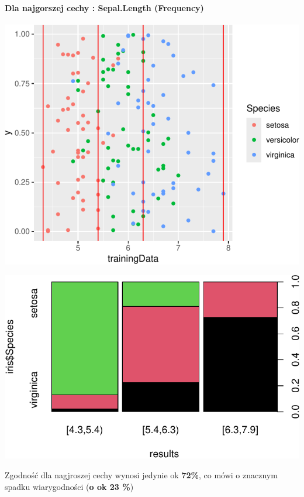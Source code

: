 \documentclass[
  12pt,
]{article}
\begin{document}
\paragraph{Dla najgorszej cechy : Sepal.Length
(Frequency)}\label{dla-najgorszej-cechy-sepal.length-frequency}

\begin{center}\includegraphics{Sprawozdanie2_files/figure-latex/frequences_najg-1} \end{center}

\begin{center}\includegraphics{Sprawozdanie2_files/figure-latex/tabela_kondygnacji_1_najg-1} \end{center}

Zgodność dla nagjroszej cechy wynosi jedynie ok \textbf{72\%}, co mówi o
znacznym spadku wiarygodności (\textbf{o ok 23 \%})
\end{document}
